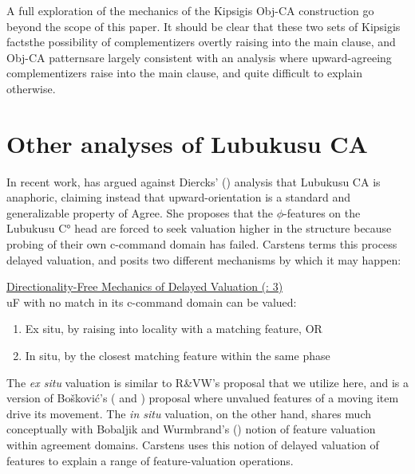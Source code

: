 \documentclass[output=paper
,modfonts
,nonflat
]{langsci/langscibook}
\begin{document}
A full exploration of the mechanics of the Kipsigis Obj-CA construction go beyond the scope of this paper. It should be clear that these two sets of Kipsigis facts\textemdash the possibility of complementizers overtly raising into the main clause, and Obj-CA patterns\textemdash are largely consistent with an analysis where upward-agreeing complementizers raise into the main clause, and quite difficult to explain otherwise. 

\section{Other analyses of Lubukusu CA }\label{sectioncarstens}

In recent work, \citet{Carstens:2016} has argued against Diercks’ (\citeyear{Diercks:2013}) analysis that Lubukusu CA is anaphoric, claiming instead that upward-orientation is a standard and generalizable property of Agree. She proposes that the $ \phi $-features on the Lubukusu C° head are forced to seek valuation higher in the structure because probing of their own c-command domain has failed. Carstens terms this process delayed valuation, and posits two different mechanisms by which it may happen:

\begin{exe}
\ex \underline{Directionality-Free Mechanics of Delayed Valuation (\citealt{Carstens:2016}: 3)}\\
	uF with no match in its c-command domain can be valued:
	\begin{enumerate}
		\item Ex situ, by raising into locality with a matching feature, OR
		\item In situ, by the closest matching feature within the same phase
	\end{enumerate}
\end{exe}

{\noindent}The \textit{ex situ} valuation is similar to R\&VW's proposal that we utilize here, and is a version of Bo\v{s}kovi\'{c}'s (\citeyear{Boskovic:2007b} and \citeyear{Boskovic:2011}) proposal where unvalued features of a moving item drive its movement. The \textit{in situ} valuation, on the other hand, shares much conceptually with Bobaljik and Wurmbrand's (\citeyear{BobaljikWurmbrand:2005}) notion of feature valuation within agreement domains. Carstens uses this notion of delayed valuation of features to explain a range of feature-valuation operations.
\end{document}
